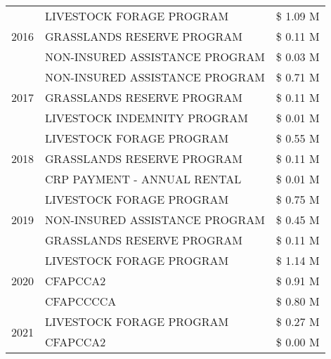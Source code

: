 \begin{tabular}{llr}
\cline{1-3}
\multirow[t]{3}{*}{2016} & LIVESTOCK FORAGE PROGRAM & \$ 1.09 M \\
 & GRASSLANDS RESERVE PROGRAM & \$ 0.11 M \\
 & NON-INSURED ASSISTANCE PROGRAM & \$ 0.03 M \\
\cline{1-3}
\multirow[t]{3}{*}{2017} & NON-INSURED ASSISTANCE PROGRAM & \$ 0.71 M \\
 & GRASSLANDS RESERVE PROGRAM & \$ 0.11 M \\
 & LIVESTOCK INDEMNITY PROGRAM & \$ 0.01 M \\
\cline{1-3}
\multirow[t]{3}{*}{2018} & LIVESTOCK FORAGE PROGRAM & \$ 0.55 M \\
 & GRASSLANDS RESERVE PROGRAM & \$ 0.11 M \\
 & CRP PAYMENT - ANNUAL RENTAL & \$ 0.01 M \\
\cline{1-3}
\multirow[t]{3}{*}{2019} & LIVESTOCK FORAGE PROGRAM & \$ 0.75 M \\
 & NON-INSURED ASSISTANCE PROGRAM & \$ 0.45 M \\
 & GRASSLANDS RESERVE PROGRAM & \$ 0.11 M \\
\cline{1-3}
\multirow[t]{3}{*}{2020} & LIVESTOCK FORAGE PROGRAM & \$ 1.14 M \\
 & CFAPCCA2 & \$ 0.91 M \\
 & CFAPCCCCA & \$ 0.80 M \\
\cline{1-3}
\multirow[t]{2}{*}{2021} & LIVESTOCK FORAGE PROGRAM & \$ 0.27 M \\
 & CFAPCCA2 & \$ 0.00 M \\
\cline{1-3}
\bottomrule
\end{tabular}
